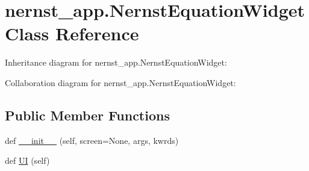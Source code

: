 \hypertarget{classnernst__app_1_1NernstEquationWidget}{}\section{nernst\+\_\+app.\+Nernst\+Equation\+Widget Class Reference}
\label{classnernst__app_1_1NernstEquationWidget}


Inheritance diagram for nernst\+\_\+app.\+Nernst\+Equation\+Widget\+:


Collaboration diagram for nernst\+\_\+app.\+Nernst\+Equation\+Widget\+:
\subsection*{Public Member Functions}
\begin{DoxyCompactItemize}
\item 
def \hyperlink{classnernst__app_1_1NernstEquationWidget_a1e2eb76be9caac1773f1599c196c5d64}{\+\_\+\+\_\+init\+\_\+\+\_\+} (self, screen=None, args, kwrds)
\item 
def \hyperlink{classnernst__app_1_1NernstEquationWidget_a883d90598b1a75b6b4f9eac8f31e39fa}{UI} (self)
\end{DoxyCompactItemize}
